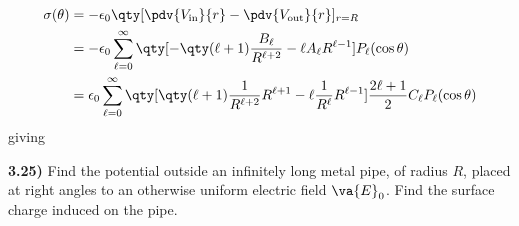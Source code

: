 \documentclass[12pt,a4paper]{article}
\newcommand{\prob}[2]{\textbf{#1)} #2}
\begin{document}
\begin{align*}
\sigma(\theta) &= -\epsilon_0\qty[\pdv{V_{\rm in}}{r} - \pdv{V_{\rm out}}{r}]_{r=R} \\
 &= -\epsilon_0\sum_{\ell = 0}^{\infty} \qty[-\qty(\ell + 1)\frac{B_{\ell}}{R^{\ell + 2}} - \ell A_{\ell}R^{\ell - 1}]P_{\ell}(\cos{\theta}) \\
&= \epsilon_0\sum_{\ell = 0}^{\infty} \qty[\qty(\ell + 1)\frac{1}{R^{\ell + 2}}R^{\ell+1} - \ell\frac{1}{R^{\ell}}R^{\ell - 1}]\frac{2\ell + 1}{2}C_{\ell}P_{\ell}(\cos{\theta}) \\
\end{align*}
giving

\prob{3.25}{Find the potential outside an infinitely long metal pipe, of radius $R$, placed at right angles to an otherwise uniform electric field $\va{E}_0$. Find the surface charge induced on the pipe.}
\end{document}
